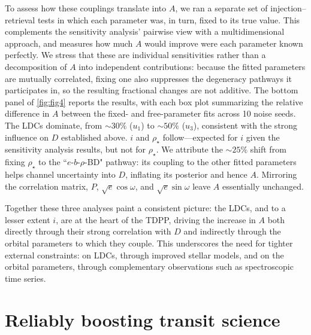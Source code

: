 \documentclass[twocolumn]{aastex631}
\newcommand{\vtwo}[1]{{#1}}
\begin{document}
\vtwo{To assess how these couplings translate into $A$, we ran a separate set of injection--retrieval tests in which each parameter was, in turn, fixed to its true value. This complements the sensitivity analysis' pairwise view with a multidimensional approach, and measures how much $A$ would improve were each parameter known perfectly. We stress that these are individual sensitivities rather than a decomposition of $A$ into independent contributions: because the fitted parameters are mutually correlated, fixing one also suppresses the degeneracy pathways it participates in, so the resulting fractional changes are not additive. The bottom panel of \autoref{fig:fig4} reports the results, with each box plot summarizing the relative difference in $A$ between the fixed- and free-parameter fits across 10 noise seeds. The LDCs dominate, from $\sim30\%$ ($u_1$) to $\sim50\%$ ($u_3$), consistent with the strong influence on $D$ established above. $i$ and $\rho_\star$ follow---expected for $i$ given the sensitivity analysis results, but not for $\rho_\star$. We attribute the $\sim25\%$ shift from fixing $\rho_\star$ to the ``$e$-$b$-$\rho$-BD" pathway: its coupling to the other fitted parameters helps channel uncertainty into $D$, inflating its posterior and hence $A$. Mirroring the correlation matrix, $P$, $\sqrt{e}\cos{\omega}$, and $\sqrt{e}\sin{\omega}$ leave $A$ essentially unchanged.}

\vtwo{Together these three analyses paint a consistent picture: the LDCs, and to a lesser extent $i$, are at the heart of the TDPP, driving the increase in $A$ both directly through their strong correlation with $D$ and indirectly through the orbital parameters to which they couple. This underscores the need for tighter external constraints: on LDCs, through improved stellar models, and on the orbital parameters, through complementary observations such as spectroscopic time series.}

\section{Reliably boosting transit science}\label{sec:boosting_science}
\end{document}
